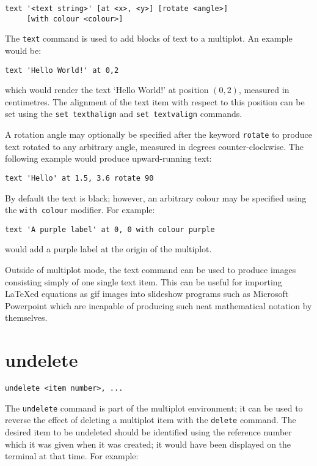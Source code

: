 \begin{verbatim}
text '<text string>' [at <x>, <y>] [rotate <angle>]
     [with colour <colour>]
\end{verbatim}

The {\tt text} command is used to add blocks of text to a multiplot. An example
would be:

\begin{verbatim}
text 'Hello World!' at 0,2
\end{verbatim}

\noindent which would render the text `Hello World!' at position $(0,2)$,
measured in centimetres. The alignment of the text item with respect to this
position can be set using the {\tt set texthalign} and {\tt set textvalign}
commands.

A rotation angle may optionally be specified after the keyword {\tt rotate}
to produce text rotated to any arbitrary angle, measured in degrees
counter-clockwise. The following example would produce upward-running text:

\begin{verbatim}
text 'Hello' at 1.5, 3.6 rotate 90
\end{verbatim}

By default the text is black; however, an arbitrary colour may be specified
using the {\tt with colour} modifier.  For example:

\begin{verbatim}
text 'A purple label' at 0, 0 with colour purple
\end{verbatim}

\noindent would add a purple label at the origin of the multiplot.

Outside of multiplot mode, the text command can be used to produce images
consisting simply of one single text item. This can be useful for importing
\LaTeX ed equations as gif images into slideshow programs such as Microsoft
Powerpoint which are incapable of producing such neat mathematical notation
by themselves.

\section{undelete}

\begin{verbatim}
undelete <item number>, ...
\end{verbatim}

The {\tt undelete} command is part of the multiplot environment; it can be used
to reverse the effect of deleting a multiplot item with the {\tt delete}
command. The desired item to be undeleted should be identified using the
reference number which it was given when it was created; it would have been
displayed on the terminal at that time. For example:

